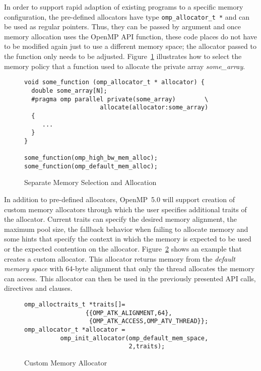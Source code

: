 In order to support rapid adaption of existing programs to a specific memory 
configuration, the pre-defined allocators have type 
\texttt{omp\_allocator\_t *} and can be used as regular pointers. Thus, they 
can be passed by argument and once memory allocation uses the OpenMP API 
function, these code places do not have to be modified again just to use a 
different memory space; the allocator passed to the function only needs to 
be adjusted. Figure~\ref{fig:separation-concerns-alloc} illustrates how to
select the memory policy that a function used to allocate the private array 
\emph{some\_array}.


\begin{figure}[t]
\begin{verbatim}
void some_function (omp_allocator_t * allocator) {
  double some_array[N];
  #pragma omp parallel private(some_array)        \
                     allocate(allocator:some_array)
  {
     ...
  }
}

some_function(omp_high_bw_mem_alloc);
some_function(omp_default_mem_alloc);
\end{verbatim}
\caption{Separate Memory Selection and Allocation\label{fig:separation-concerns-alloc}}
\end{figure}

In addition to pre-defined allocators, OpenMP~5.0 will support creation of 
custom memory allocators through which the user specifies additional traits 
of the allocator. Current traits can specify the desired memory alignment, 
the maximum pool size, the fallback behavior when failing to allocate memory 
and some hints that specify the context in which the memory is expected to be
used or the expected contention on the allocator. 
Figure~\ref{fig:custom-allocator} shows an example that creates a custom 
allocator. This allocator returns memory from the \emph{default memory space} 
with 64-byte alignment that only the thread allocates the memory can access.
This allocator can then be used in the previously presented API calls, 
directives and clauses.

\begin{figure}[t]
\begin{verbatim}
omp_alloctraits_t *traits[]=
                 {{OMP_ATK_ALIGNMENT,64},
                  {OMP_ATK_ACCESS,OMP_ATV_THREAD}};
omp_allocator_t *allocator = 
          omp_init_allocator(omp_default_mem_space,
                             2,traits);
\end{verbatim}
\caption{Custom Memory Allocator\label{fig:custom-allocator}}
\end{figure}


